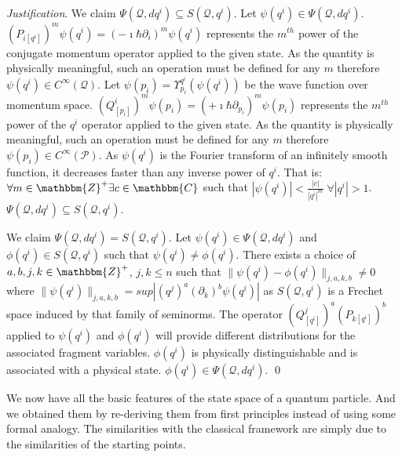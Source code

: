 \documentclass[aps,pra,10pt,twocolumn,floatfix,nofootinbib]{revtex4-1}
\numberwithin{equation}{section}
\theoremstyle{definition}
\newenvironment{justification}{\emph{Justification}.}{\qed}
\begin{document}
\begin{justification}
	We claim $\Psi(\mathcal{Q}, dq^i) \subseteq S(\mathcal{Q}, q^i)$. Let $\psi(q^i) \in \Psi(\mathcal{Q}, dq^i)$. $(P_{i [q^i]})^m \psi(q^i) = (-\imath \hbar \partial_i)^m \psi(q^i)$ represents the $m^{th}$ power of the conjugate momentum operator applied to the given state. As the quantity is physically meaningful, such an operation must be defined for any $m$ therefore $\psi(q^i) \in C^\infty(\mathcal{Q})$. Let $\psi(p_i) = \Upsilon^{q^i}_{p_i} (\psi(q^i))$ be the wave function over momentum space. $(Q^i_{[p_i]})^m \psi(p_i) = (+\imath \hbar \partial_{p_i})^m \psi(p_i)$ represents the $m^{th}$ power of the $q^i$ operator applied to the given state. As the quantity is physically meaningful, such an operation must be defined for any $m$ therefore $\psi(p_i) \in C^\infty(\mathcal{P})$. As $\psi(q^i)$ is the Fourier transform of an infinitely smooth function, it decreases faster than any inverse power of $q^i$. That is: $\forall m \in \mathbbm{Z}^+ \exists c \in \mathbbm{C}$ such that  $|\psi(q^i)|<\frac{|c|}{|q^i|^m} \; \forall |q^i|> 1$. $\Psi(\mathcal{Q}, dq^i) \subseteq S(\mathcal{Q}, q^i)$.
	
	We claim $\Psi(\mathcal{Q}, dq^i) = S(\mathcal{Q}, q^i)$. Let $\psi(q^i) \in \Psi(\mathcal{Q}, dq^i)$ and $\phi(q^i) \in S(\mathcal{Q}, q^i)$ such that $\psi(q^i) \neq \phi(q^i)$. There exists a choice of $a, b, j, k \in \mathbbm{Z}^+$, $j,k \leq n$ such that $\lVert \psi(q^i) - \phi(q^i) \rVert_{j,a,k,b} \neq 0$  where $\lVert \psi(q^i) \rVert_{j,a,k,b} = sup|(q^j)^a (\partial_k) ^b \psi(q^i)|$ as $S(\mathcal{Q}, q^i)$ is a Frechet space induced by that family of seminorms. The operator $(Q^j_{[q^i]})^a(P_{k [q^i]})^b$ applied to $\psi(q^i)$ and $\phi(q^i)$ will provide different distributions for the associated fragment variables. $\phi(q^i)$ is physically distinguishable and is associated with a physical state. $\phi(q^i) \in \Psi(\mathcal{Q}, dq^i)$.
\end{justification}

We now have all the basic features of the state space of a quantum particle. And we obtained them by re-deriving them from first principles instead of using some formal analogy. The similarities with the classical framework are simply due to the similarities of the starting points.
\end{document}
